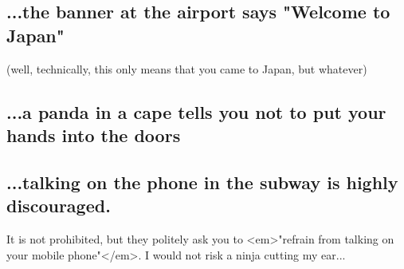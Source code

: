 \begin{post}
	\begin{content}	
\subsection{...the banner at the airport says "Welcome to Japan"}
(well, technically, this only means that you came to Japan, but whatever)	

\subsection{...a panda in a cape tells you not to put your hands into the doors}
\begin{figure}[!h]
\centering
{}
\end{figure}

\subsection{...talking on the phone in the subway is highly discouraged.}
It is not prohibited, but they politely ask you to <em>"refrain from talking on your mobile phone"</em>. I would not risk a ninja cutting my ear...


\end{content}
\end{post}
